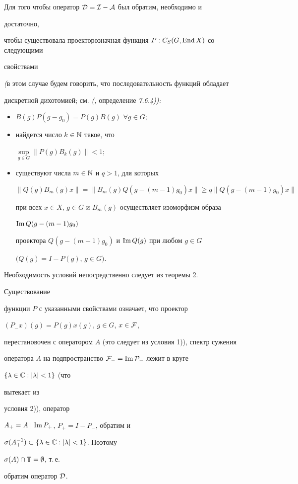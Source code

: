 \begin{thm} Для того чтобы оператор $\cal D=I-A$ был обратим, необходимо и 


достаточно, 


чтобы существовала проекторозначная функция $P:C_S(G,\operatorname{End} X)$ со следующими 


свойствами 


{\em (}в этом случае будем говорить, что последовательность функций обладает 


дискретной дихотомией; см. {\em (\cite{Hen},} определение {\em 7.6.4)):} 


\begin{itemize} 


\item[1)] $B(g)P(g-g_0)=P(g)B(g)$ $\forall g\in G;$ 


\item[2)] найдется число $k\in\Bbb N$ такое, что 


$\sup\limits_{g\in G}\|P(g)B_k(g)\|<1;$ 


\item[3)] существуют числа $m\in\Bbb N$ и $q>1$, для которых 


$$ 


\|Q(g)B_m(g)x\|=\|B_m(g)Q(g-(m-1)g_0)x\| \ge 


q\|Q(g-(m-1)g_0)x\| 


$$ 


при всех $x\in X$, $g\in G$ и $B_m(g)$ осуществляет изоморфизм образа 


$\operatorname{Im} Q(g-(m-1)g_0)$ 


проектора $Q(g-(m-1)g_0)$ и $\operatorname{Im} Q(g)$ при любом $g\in G$ 


$(Q(g)=I-P(g)$, $g\in G)$. 


\end{itemize} 


\end{thm} 


 


\begin{pf} Необходимость условий непосредственно следует из теоремы 2. 


Существование 


функции $P$ с указанными свойствами означает, что проектор 


$(P_-x)(g)=P(g)x(g)$, $g\in G$, $x\in\cal F$,


перестановочен с оператором $A$ (это следует из условия 1)), спектр сужения 


оператора $A$ на подпространство $\cal F_-=\operatorname{Im} P_-$ лежит в круге 


$\{\lambda\in\Bbb C:|\lambda|<1\}$ (что 


вытекает из 


условия 2)), оператор 


$A_+=A\mid\operatorname{Im} P_+$, $P_+=I-P_-$, обратим и 


$\sigma(A_+^{-1})\subset\{\lambda\in\Bbb C:|\lambda|<1\}$. Поэтому 


$\sigma(A)\cap\Bbb T=\emptyset$, т.\,е. 


обратим оператор $\cal D$. 


\end{pf} 


